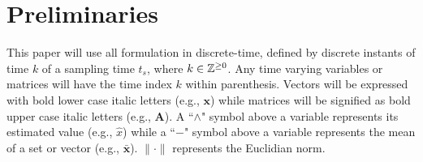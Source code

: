 
\section{Preliminaries} \label{sec:preliminaries}

This paper will use all formulation in discrete-time, defined by discrete instants of time $k$ of a sampling time $t_s$, where $k \in \mathbb{Z}^{\geq0}$. Any time varying variables or matrices will have the time index $k$ within parenthesis. Vectors will be expressed with bold lower case italic letters (e.g., $\bm{x}$) while matrices will be signified as bold upper case italic letters (e.g., $\bm{A}$). A ``$\wedge$" symbol above a variable represents its estimated value (e.g., $\hat{x}$) while a ``$-$" symbol above a variable represents the mean of a set or vector (e.g., $\bar{\bm{x}}$). $\lVert\cdot\rVert$ represents the Euclidian norm.

